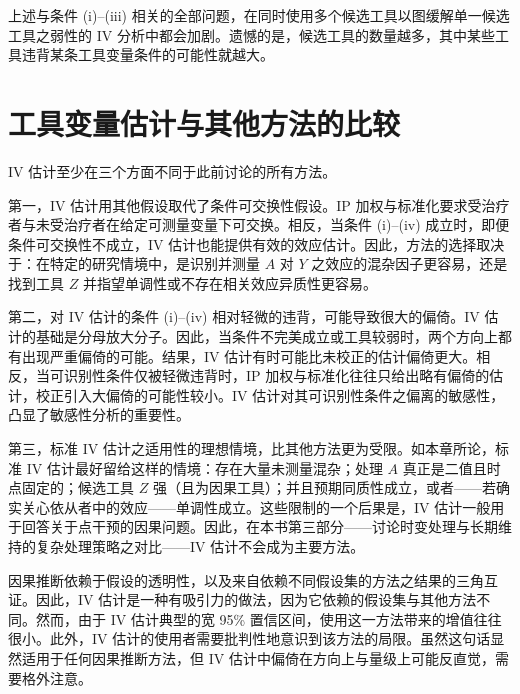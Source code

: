 上述与条件 (i)–(iii) 相关的全部问题，在同时使用多个候选工具以图缓解单一候选工具之弱性的 IV 分析中都会加剧。遗憾的是，候选工具的数量越多，其中某些工具违背某条工具变量条件的可能性就越大。

\section{工具变量估计与其他方法的比较}

IV 估计至少在三个方面不同于此前讨论的所有方法。

第一，IV 估计用其他假设取代了条件可交换性假设。IP 加权与标准化要求受治疗者与未受治疗者在给定可测量变量下可交换。相反，当条件 (i)–(iv) 成立时，即便条件可交换性不成立，IV 估计也能提供有效的效应估计。因此，方法的选择取决于：在特定的研究情境中，是识别并测量 $A$ 对 $Y$ 之效应的混杂因子更容易，还是找到工具 $Z$ 并指望单调性或不存在相关效应异质性更容易。

第二，对 IV 估计的条件 (i)–(iv) 相对轻微的违背，可能导致很大的偏倚。IV 估计的基础是分母放大分子。因此，当条件不完美成立或工具较弱时，两个方向上都有出现严重偏倚的可能。结果，IV 估计有时可能比未校正的估计偏倚更大。相反，当可识别性条件仅被轻微违背时，IP 加权与标准化往往只给出略有偏倚的估计，校正引入大偏倚的可能性较小。IV 估计对其可识别性条件之偏离的敏感性，凸显了敏感性分析的重要性。

第三，标准 IV 估计之适用性的理想情境，比其他方法更为受限。如本章所论，标准 IV 估计最好留给这样的情境：存在大量未测量混杂；处理 $A$ 真正是二值且时点固定的；候选工具 $Z$ 强（且为因果工具）；并且预期同质性成立，或者——若确实关心依从者中的效应——单调性成立。这些限制的一个后果是，IV 估计一般用于回答关于点干预的因果问题。因此，在本书第三部分——讨论时变处理与长期维持的复杂处理策略之对比——IV 估计不会成为主要方法。

因果推断依赖于假设的透明性，以及来自依赖不同假设集的方法之结果的三角互证。因此，IV 估计是一种有吸引力的做法，因为它依赖的假设集与其他方法不同。然而，由于 IV 估计典型的宽 95\% 置信区间，使用这一方法带来的增值往往很小。此外，IV 估计的使用者需要批判性地意识到该方法的局限。虽然这句话显然适用于任何因果推断方法，但 IV 估计中偏倚在方向上与量级上可能反直觉，需要格外注意。

